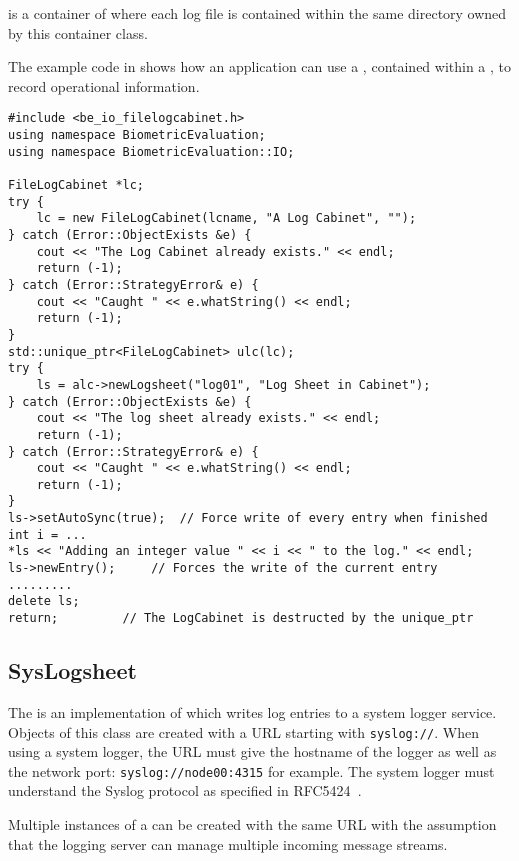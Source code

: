  is a container of  where
each log file is contained within the same directory owned by this container
class.

The example code in  shows how an application can use 
a , contained within a , to record
operational information.

\begin{lstlisting}[caption={Using a \class{FileLogsheet} within a \class{FileLogCabinet}}, label=lst:logcabinetuse]
#include <be_io_filelogcabinet.h>
using namespace BiometricEvaluation;
using namespace BiometricEvaluation::IO;

FileLogCabinet *lc;
try {
    lc = new FileLogCabinet(lcname, "A Log Cabinet", "");
} catch (Error::ObjectExists &e) {
    cout << "The Log Cabinet already exists." << endl;
    return (-1);
} catch (Error::StrategyError& e) {
    cout << "Caught " << e.whatString() << endl;
    return (-1);
}
std::unique_ptr<FileLogCabinet> ulc(lc);
try {
    ls = alc->newLogsheet("log01", "Log Sheet in Cabinet");
} catch (Error::ObjectExists &e) {
    cout << "The log sheet already exists." << endl;
    return (-1);
} catch (Error::StrategyError& e) {
    cout << "Caught " << e.whatString() << endl;
    return (-1);
}
ls->setAutoSync(true);	// Force write of every entry when finished
int i = ...
*ls << "Adding an integer value " << i << " to the log." << endl;
ls->newEntry();		// Forces the write of the current entry
.........
delete ls;
return;			// The LogCabinet is destructed by the unique_ptr
\end{lstlisting}

\subsection{SysLogsheet}
\label{sec-syslogsheet}

The  is an implementation of  which writes
log entries to a system logger service. Objects of this class are created
with a URL starting with \verb=syslog://=.
When using a system logger, the URL must give the hostname of the logger as
well as the network port: \verb=syslog://node00:4315= for example. The system
logger must understand the Syslog protocol as specified in
RFC5424~\cite{rfc5425}.

Multiple instances of a  can be created with the same URL
with the assumption that the logging server can manage multiple incoming
message streams.

